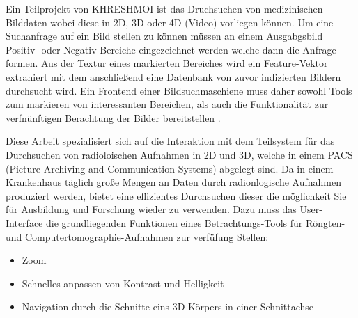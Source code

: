 Ein Teilprojekt von KHRESHMOI ist das Druchsuchen von medizinischen Bilddaten wobei diese in 2D, 3D oder 4D (Video) vorliegen können.
Um eine Suchanfrage auf ein Bild stellen zu können müssen an einem Ausgabgsbild Positiv- oder Negativ-Bereiche eingezeichnet werden welche dann die Anfrage formen.
Aus der Textur eines markierten Bereiches wird ein Feature-Vektor extrahiert mit dem anschließend eine Datenbank von zuvor indizierten Bildern durchsucht wird.
%
Ein Frontend einer Bildsuchmaschiene muss daher sowohl Tools zum markieren von interessanten Bereichen, 
als auch die Funktionalität zur verfnünftigen Berachtung der Bilder bereitstellen \cite{kres}.

Diese Arbeit spezialisiert sich auf die Interaktion mit dem Teilsystem für das Durchsuchen von radioloischen Aufnahmen in 2D und 3D,
welche in einem PACS (Picture Archiving and Communication Systems) abgelegt sind.
Da in einem Krankenhaus täglich große Mengen an Daten durch radionlogische Aufnahmen produziert werden, 
bietet eine effizientes Durchsuchen dieser die möglichkeit Sie für Ausbildung und Forschung wieder zu verwenden.
%
Dazu muss das User-Interface die grundliegenden Funktionen eines Betrachtungs-Tools für Röngten- und Computertomographie-Aufnahmen zur verfüfung Stellen:
\begin{itemize}
	\item Zoom
	\item Schnelles anpassen von Kontrast und Helligkeit
	\item Navigation durch die Schnitte eins 3D-Körpers in einer Schnittachse
\end{itemize}
\cite{pacs}


